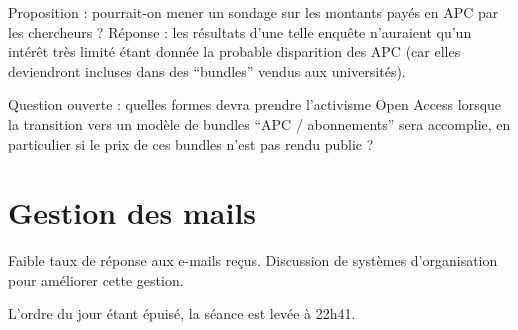 \documentclass[a4paper]{article}
\begin{document}
Proposition : pourrait-on mener un sondage sur les montants payés en APC par les chercheurs ? Réponse : les résultats d'une telle enquête n'auraient qu'un intérêt très limité étant donnée la probable disparition des APC (car elles deviendront incluses dans des ``bundles'' vendus aux universités). 

Question ouverte : quelles formes devra prendre l'activisme Open Access lorsque la transition vers un modèle de bundles ``APC / abonnements'' sera accomplie, en particulier si le prix de ces bundles n'est pas rendu public ?


\section{Gestion des mails}
Faible taux de réponse aux e-mails reçus. Discussion de systèmes d'organisation pour améliorer cette gestion.



\bigskip

L'ordre du jour étant épuisé, la séance est levée à 22h41. 
\end{document}
